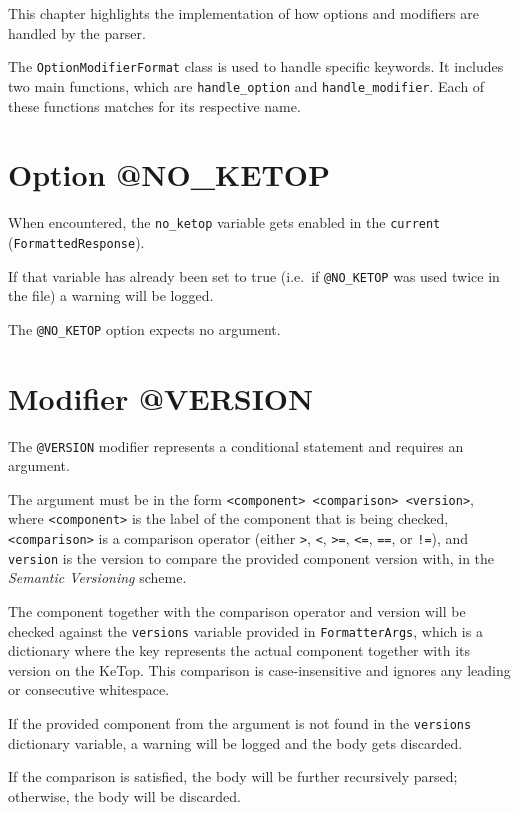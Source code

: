 
This chapter highlights the implementation of how options and modifiers are handled by the parser. 

The \verb|OptionModifierFormat| class is used to handle specific keywords. It includes two main functions, which are \verb|handle_option| and \verb|handle_modifier|. Each of these functions matches for its respective name. 

\section{Option @NO\_KETOP}

When encountered, the \verb|no_ketop| variable gets enabled in the \verb|current| \\(\verb|FormattedResponse|).

If that variable has already been set to true (i.e.\ if \verb|@NO_KETOP| was used twice in the file) a warning will be logged.

The \verb|@NO_KETOP| option expects no argument. 

\section{Modifier @VERSION}

The \verb|@VERSION| modifier represents a conditional statement and requires an argument.

The argument must be in the form \verb|<component> <comparison> <version>|, where \verb|<component>| is the label of the component that is being checked, \verb|<comparison>| is a comparison operator (either \verb|>|, \verb|<|, \verb|>=|, \verb|<=|, \verb|==|, or \verb|!=|), and \verb|version| is the version to compare the provided component version with, in the \textit{Semantic Versioning} scheme.

The component together with the comparison operator and version will be checked against the \verb|versions| variable provided in \verb|FormatterArgs|, which is a dictionary where the key represents the actual component together with its version on the KeTop. This comparison is case-insensitive and ignores any leading or consecutive whitespace. 

If the provided component from the argument is not found in the \verb|versions| dictionary variable, a warning will be logged and the body gets discarded. 

If the comparison is satisfied, the body will be further recursively parsed; otherwise, the body will be discarded. 

